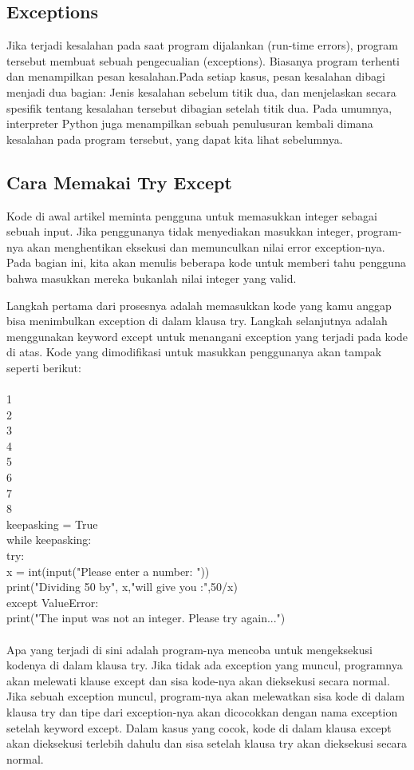 \subsection{Exceptions}
Jika terjadi kesalahan pada saat program dijalankan (run-time errors), program tersebut membuat sebuah pengecualian (exceptions). Biasanya program terhenti
dan menampilkan pesan kesalahan.Pada setiap kasus, pesan kesalahan dibagi menjadi dua bagian: Jenis kesalahan sebelum titik dua, dan menjelaskan secara spesifik tentang kesalahan tersebut
dibagian setelah titik dua. Pada umumnya, interpreter Python juga menampilkan sebuah penulusuran kembali dimana kesalahan pada program tersebut, yang dapat
kita lihat sebelumnya.

\subsection{Cara Memakai Try Except}
Kode di awal artikel meminta pengguna untuk memasukkan integer sebagai sebuah input. Jika penggunanya tidak menyediakan masukkan integer, program-nya akan menghentikan eksekusi dan memunculkan nilai error exception-nya. Pada bagian ini, kita akan menulis beberapa kode untuk memberi tahu pengguna bahwa masukkan mereka bukanlah nilai integer yang valid.

Langkah pertama dari prosesnya adalah memasukkan kode yang kamu anggap bisa menimbulkan exception di dalam klausa try. Langkah selanjutnya adalah menggunakan keyword except untuk menangani exception yang terjadi pada kode di atas. Kode yang dimodifikasi untuk masukkan penggunanya akan tampak seperti berikut:\\\\
1\\
2\\
3\\
4\\
5\\
6\\
7\\
8\\
keepasking = True\\ 
while keepasking:\\
    try:\\
        x = int(input("Please enter a number: "))\\
        print("Dividing 50 by", x,"will give you :",50/x)\\
    except ValueError:\\
        print("The input was not an integer. Please try again...")\\\\
Apa yang terjadi di sini adalah program-nya mencoba untuk mengeksekusi kodenya di dalam klausa try. Jika tidak ada exception yang muncul, programnya akan melewati klause except dan sisa kode-nya akan dieksekusi secara normal. Jika sebuah exception muncul, program-nya akan melewatkan sisa kode di dalam klausa try dan tipe dari exception-nya akan dicocokkan dengan nama exception setelah keyword except. Dalam kasus yang cocok, kode di dalam klausa except akan dieksekusi terlebih dahulu dan sisa setelah klausa try akan dieksekusi secara normal.

